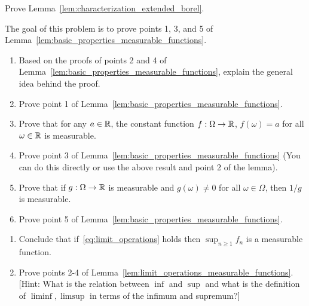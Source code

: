 \begin{problem}\label{prb:characterization_extended_borel}
Prove Lemma~\ref{lem:characterization_extended_borel}.
\end{problem}

\begin{problem}\label{prb:basic_properties_measurable_functions}
The goal of this problem is to prove points 1, 3, and 5 of Lemma~\ref{lem:basic_properties_measurable_functions}.
\begin{enumerate}[label=(\alph*)]
\item Based on the proofs of points 2 and 4 of Lemma~\ref{lem:basic_properties_measurable_functions}, explain the general idea behind the proof.
\item Prove point 1 of Lemma~\ref{lem:basic_properties_measurable_functions}.
\item Prove that for any $a \in \mathbb R$, the constant function $f : \Omega \to \mathbb R$, $f(\omega) = a$ for all $\omega \in \mathbb R$ is measurable.
\item Prove point 3 of Lemma~\ref{lem:basic_properties_measurable_functions} (You can do this directly or use the above result and point 2 of the lemma).
\item Prove that if $g : \Omega \to \mathbb R$ is measurable and $g(\omega) \ne 0$ for all $\omega \in \Omega$, then $1/g$ is measurable.
\item Prove point 5 of Lemma~\ref{lem:basic_properties_measurable_functions}.
\end{enumerate}
\end{problem}

\begin{problem}\label{prb:limit_operations_measurable_functions}
\hfil
\begin{enumerate}[label=(\alph*)]
\item Conclude that if~\eqref{eq:limit_operations} holds then $\sup_{n \ge 1} f_n$ is a measurable function.
\item Prove points 2-4 of Lemma~\ref{lem:limit_operations_measurable_functions}. [Hint: What is the relation between $\inf$ and $\sup$ and what is the definition of $\liminf, \limsup$ in terms of the infimum and supremum?]
\end{enumerate}
\end{problem}

